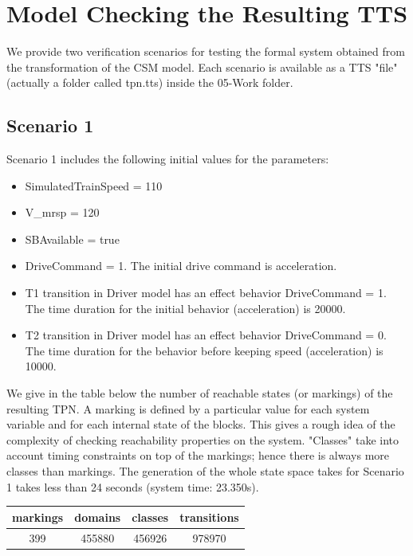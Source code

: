 \section{Model Checking the Resulting TTS}
\label{sec:space}
We provide two verification scenarios for testing the formal system
obtained from the transformation of the CSM model. Each scenario is
available as a TTS "file" (actually a folder called tpn.tts) inside
the 05-Work folder.

\subsection{Scenario 1}
Scenario 1 includes the following initial values for the parameters:
\begin{itemize}
\item
SimulatedTrainSpeed = 110
\item
V\_mrsp = 120
\item
SBAvailable = true
\item
DriveCommand = 1. The initial drive command is acceleration. 
\item
T1 transition in Driver model has an effect behavior DriveCommand = 1. The time duration for the initial behavior (acceleration) is 20000. 
\item
T2 transition in Driver model has an effect behavior DriveCommand = 0. The time duration for the behavior before keeping speed (acceleration) is 10000. 
\end{itemize}

We give in the table below the number of reachable states (or
markings) of the resulting TPN. A marking is defined by a particular
value for each system variable and for each internal state of the
blocks. This gives a rough idea of the complexity of checking
reachability properties on the system. "Classes" take into account
timing constraints on top of the markings; hence there is always more
classes than markings. The generation of the whole state space takes
for Scenario 1 takes
less than 24 seconds (system time: 23.350s).\\

\begin{center}
  \begin{tabular}{|c|c|c|c|}
    \hline
    markings & domains & classes & transitions \\
    \hline
    399 & 455880 & 456926 & 978970 \\ 
    \hline
  \end{tabular}
\end{center}

